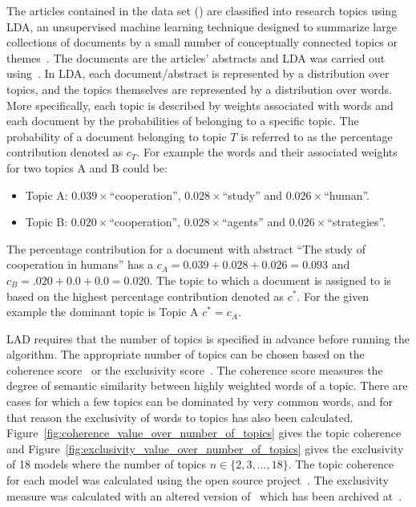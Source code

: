 \documentclass{article}
\theoremstyle{definition}
\begin{document}
The articles contained in the data set (\cite{pd_data_2018}) are classified
into research topics using LDA, an unsupervised machine learning technique
designed to summarize large collections of documents by a small number of
conceptually connected topics or themes~\cite{Blei2003, Grimmer2013}. The
documents are the articles' abstracts and LDA was carried out using~\cite{rehurek_lrec}.
In LDA, each document/abstract is represented by a distribution over topics,
and the topics themselves are represented by a distribution over words. More
specifically, each topic is described by weights associated with words and
each document by the probabilities of belonging to a specific topic. The
probability of a document belonging to topic \(T\) is referred to as the percentage
contribution denoted as \(c_T\). For example the words and their associated
weights for two topics A and B could be:

\begin{itemize}
    \item Topic A: \(0.039 \times\)``cooperation'', \(0.028 \times\)``study'' and \(0.026 \times\)``human''.
    \item Topic B: \(0.020 \times\)``cooperation'', \(0.028 \times\)``agents'' and
    \(0.026 \times\)``strategies''.
\end{itemize}

The percentage contribution for a document with abstract ``The study of
cooperation in humans'' has a \(c_{A} = 0.039 + 0.028 + 0.026 = 0.093\) and
\(c_B = .020 + 0.0 + 0.0 = 0.020\). The topic to which a document is assigned to
is based on the highest percentage contribution denoted as \(c^*\). For the
given example the dominant topic is Topic A \(c^*=c_A\).

LAD requires that the number of topics is specified in advance before running
the algorithm. The appropriate number of topics can be chosen based on the
coherence score~\cite{Roder2015} or the exclusivity score~\cite{Airoldi2012}. The
coherence score measures the degree of semantic similarity between highly weighted
words of a topic. There are cases for which a few topics can be dominated by very
common words, and for that reason the exclusivity of words to topics has also
been calculated.
Figure~\ref{fig:coherence_value_over_number_of_topics} gives the topic coherence
and Figure~\ref{fig:exclusivity_value_over_number_of_topics} gives the
exclusivity of 18 models where the number of topics \(n \in \{2, 3, \dots, 18\}\).
The topic coherence for each model was calculated using the
open source project~\cite{rehurek_lrec}. The exclusivity measure was calculated
with an altered version of~\cite{rehurek_lrec} which has been archived
at~\cite{gensim_nikoleta}.
\end{document}
